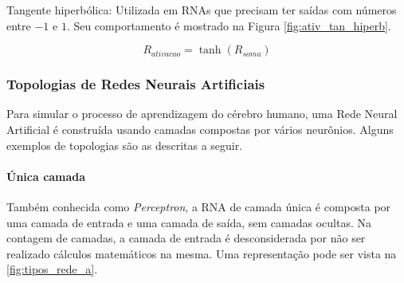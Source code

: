 \documentclass[12pt,oneside,a4paper,chapter=TITLE,section=TITLE,sumario
		=tradicional]{abntex2}
\begin{document}
\begin{lista}
			\begin{figure}[H]
			\end{figure}
			
			\item Tangente hiperbólica: Utilizada em RNAs que precisam ter saídas com números entre $-1$ e $1$. Seu comportamento é mostrado na Figura \ref{fig:ativ_tan_hiperb}.
			
			\begin{equation}
			R_{ativacao} = \tanh(R_{soma})
			\end{equation}
			
			\begin{figure}[H]
			\end{figure}  		
		\end{lista}		
			
		\subsubsection{Topologias de Redes Neurais Artificiais}
		\label{sec:topologias}
		
		Para simular o processo de aprendizagem do cérebro humano, uma Rede Neural Artificial é construída usando camadas compostas por vários neurônios. Alguns exemplos de topologias são as descritas a seguir.
		
		\paragraph{Única camada} 
		
		Também conhecida como \textit{Perceptron}, a RNA de camada única é composta por uma camada de entrada e uma camada de saída, sem camadas ocultas. Na contagem de camadas, a camada de entrada é desconsiderada por não ser realizado cálculos matemáticos na mesma. Uma representação pode ser vista na \autoref{fig:tipos_rede_a}.
		
		\begin{figure}[ht]
			\hfil
		\end{figure}
			
\end{document}
